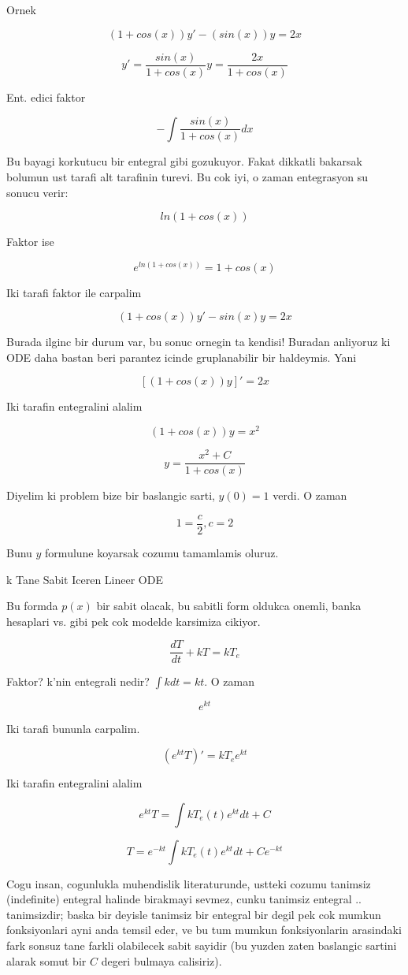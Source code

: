 \documentclass[12pt,fleqn]{article}
\begin{document}
Ornek 

\[ (1+cos(x))y' - (sin(x))y = 2x \]

\[ y' = \frac{sin(x)}{1+cos(x)}y = \frac{2x}{1+cos(x)} \]

Ent. edici faktor

\[ - \int \frac{sin(x)}{1+cos(x)} dx \]

Bu bayagi korkutucu bir entegral gibi gozukuyor. Fakat dikkatli
bakarsak bolumun ust tarafi alt tarafinin turevi. Bu cok iyi, o zaman
entegrasyon su sonucu verir:

\[ ln (1+cos(x)) \]

Faktor ise

\[ e^{ln (1+cos(x))} = 1+cos(x) \]

Iki tarafi faktor ile carpalim

\[ (1+cos(x)) y' - sin(x)y = 2x \]

Burada ilginc bir durum var, bu sonuc ornegin ta kendisi! Buradan
anliyoruz ki ODE daha bastan beri parantez icinde gruplanabilir bir
haldeymis. Yani

\[ [(1+cos(x))y]' = 2x \]

Iki tarafin entegralini alalim

\[ (1+cos(x))y = x^2 \]

\[ y = \frac{x^2+C}{1+cos(x)} \]

Diyelim ki problem bize bir baslangic sarti, $y(0) = 1$ verdi. O zaman

\[ 1=\frac{c}{2}, c=2 \]

Bunu $y$ formulune koyarsak cozumu tamamlamis oluruz. 

k Tane Sabit Iceren Lineer ODE

Bu formda $p(x)$ bir sabit olacak, bu sabitli form oldukca onemli,
banka hesaplari vs. gibi pek cok modelde karsimiza cikiyor.

\[ \frac{dT}{dt} + kT = kT_e \]

Faktor? k'nin entegrali nedir? $\int k dt = kt$. O zaman

\[ e^{kt} \]

Iki tarafi bununla carpalim. 

\[ (e^{kt} T)' = kT_e e^{kt} \]

Iki tarafin entegralini alalim

\[ e^{kt} T = \int kT_e(t) e^{kt}dt + C\]

\[ T = e^{-kt} \int kT_e(t) e^{kt} dt + C e^{-kt} \]

Cogu insan, cogunlukla muhendislik literaturunde, ustteki cozumu
tanimsiz (indefinite) entegral halinde birakmayi sevmez, cunku
tanimsiz entegral .. tanimsizdir; baska bir deyisle tanimsiz bir
entegral bir degil pek cok mumkun fonksiyonlari ayni anda temsil eder,
ve bu tum mumkun fonksiyonlarin arasindaki fark sonsuz tane farkli
olabilecek sabit sayidir (bu yuzden zaten baslangic sartini alarak
somut bir $C$ degeri bulmaya calisiriz). 
\end{document}

